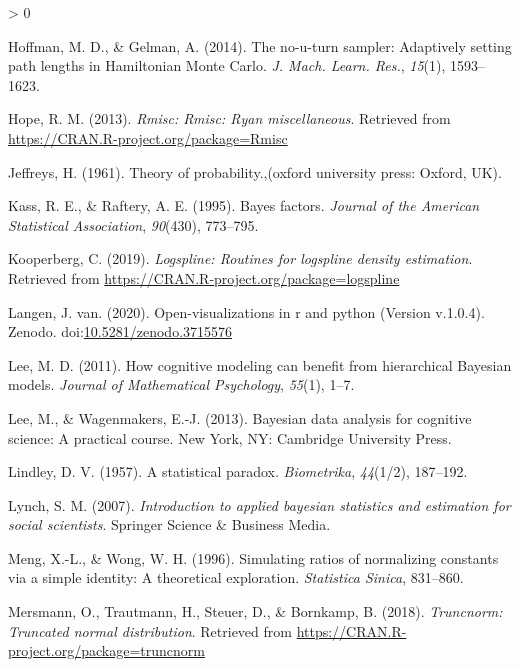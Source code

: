 \documentclass[
  english,
  doc,floatsintext]{apa6}
\newlength{\cslhangindent}
\newenvironment{CSLReferences}[2] %
 {%
  \setlength{\parindent}{0pt}
  \ifodd #1 \everypar{\setlength{\hangindent}{\cslhangindent}}\ignorespaces\fi
  \ifnum #2 > 0
  \setlength{\parskip}{#2\baselineskip}
  \fi
 }%
 {}
\begin{document}
\begin{CSLReferences}{1}{0}
\leavevmode\hypertarget{ref-hoffman2014no}{}%
Hoffman, M. D., \& Gelman, A. (2014). The no-u-turn sampler: Adaptively setting path lengths in {Hamiltonian Monte Carlo}. \emph{J. Mach. Learn. Res.}, \emph{15}(1), 1593--1623.

\leavevmode\hypertarget{ref-R-Rmisc}{}%
Hope, R. M. (2013). \emph{Rmisc: Rmisc: Ryan miscellaneous}. Retrieved from \url{https://CRAN.R-project.org/package=Rmisc}

\leavevmode\hypertarget{ref-jeffreys1961theory}{}%
Jeffreys, H. (1961). Theory of probability.,(oxford university press: Oxford, UK).

\leavevmode\hypertarget{ref-kass1995bayes}{}%
Kass, R. E., \& Raftery, A. E. (1995). Bayes factors. \emph{Journal of the American Statistical Association}, \emph{90}(430), 773--795.

\leavevmode\hypertarget{ref-logspline}{}%
Kooperberg, C. (2019). \emph{Logspline: Routines for logspline density estimation}. Retrieved from \url{https://CRAN.R-project.org/package=logspline}

\leavevmode\hypertarget{ref-j_van_langen_2020_3715576}{}%
Langen, J. van. (2020). Open-visualizations in r and python (Version v.1.0.4). Zenodo. doi:\href{https://doi.org/10.5281/zenodo.3715576}{10.5281/zenodo.3715576}

\leavevmode\hypertarget{ref-lee2011cognitive}{}%
Lee, M. D. (2011). How cognitive modeling can benefit from hierarchical {Bayesian} models. \emph{Journal of Mathematical Psychology}, \emph{55}(1), 1--7.

\leavevmode\hypertarget{ref-lee2013bayesian}{}%
Lee, M., \& Wagenmakers, E.-J. (2013). Bayesian data analysis for cognitive science: A practical course. New York, NY: Cambridge University Press.

\leavevmode\hypertarget{ref-lindley1957statistical}{}%
Lindley, D. V. (1957). A statistical paradox. \emph{Biometrika}, \emph{44}(1/2), 187--192.

\leavevmode\hypertarget{ref-lynch2007introduction}{}%
Lynch, S. M. (2007). \emph{Introduction to applied bayesian statistics and estimation for social scientists}. Springer Science \& Business Media.

\leavevmode\hypertarget{ref-meng1996simulating}{}%
Meng, X.-L., \& Wong, W. H. (1996). Simulating ratios of normalizing constants via a simple identity: A theoretical exploration. \emph{Statistica Sinica}, 831--860.

\leavevmode\hypertarget{ref-R-truncnorm}{}%
Mersmann, O., Trautmann, H., Steuer, D., \& Bornkamp, B. (2018). \emph{Truncnorm: Truncated normal distribution}. Retrieved from \url{https://CRAN.R-project.org/package=truncnorm}


\end{CSLReferences}
\end{document}
